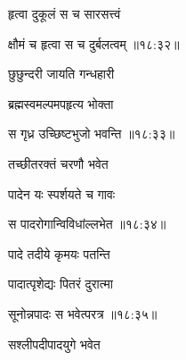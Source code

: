 \nemslokac

{\devanagarifontbold हृत्वा दुकूलं स च सारसत्त्वं }%
  \dontdisplaylinenum

\nemslokad

{\devanagarifontbold क्षौमं च हृत्वा स च दुर्बलत्वम् {॥१८:३२॥} \veg\dontdisplaylinenum }%
 
\ujvers{}

\nemslokab

{\devanagarifontbold छुछुन्दरी जायति गन्धहारी  \danda\dontdisplaylinenum }%
 
\nemslokac

{\devanagarifontbold ब्रह्मस्वमल्पमपहृत्य भोक्ता }%
  \dontdisplaylinenum

\nemslokad

{\devanagarifontbold स गृध्र उच्छिष्टभुजो भवन्ति {॥१८:३३॥} \veg\dontdisplaylinenum }%
 
\ujvers{}

\nemslokab

{\devanagarifontbold तच्छीतरक्तं चरणौ भवेत  \danda\dontdisplaylinenum }%
 
\nemslokac

{\devanagarifontbold पादेन यः स्पर्शयते च गावः }%
  \dontdisplaylinenum

\nemslokad

{\devanagarifontbold स पादरोगान्विविधांल्लभेत {॥१८:३४॥} \veg\dontdisplaylinenum }%
 
\ujvers{}

\nemslokab

{\devanagarifontbold पादे तदीये कृमयः पतन्ति  \danda\dontdisplaylinenum }%
 
\nemslokac

{\devanagarifontbold पादात्पृशेद्यः पितरं दुरात्मा }%
  \dontdisplaylinenum

\nemslokad

{\devanagarifontbold सूनोन्नपादः स भवेत्परत्र {॥१८:३५॥} \veg\dontdisplaylinenum }%
 
\ujvers{}

\nemslokab

{\devanagarifontbold सश्लीपदीपादयुगे भवेत  \danda\dontdisplaylinenum }%
 
\nemslokac

